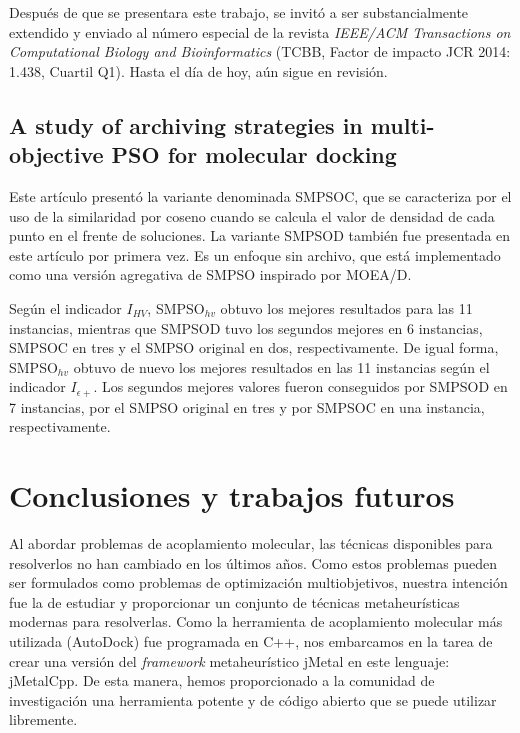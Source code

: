 Después de que se presentara este trabajo, se invitó a ser substancialmente extendido y enviado al número especial de la revista \emph{IEEE/ACM Transactions on Computational Biology and Bioinformatics} (TCBB, Factor de impacto JCR 2014: 1.438, Cuartil Q1). Hasta el día de hoy, aún sigue en revisión.

\subsection*{A study of archiving strategies in multi-objective PSO for molecular docking}


Este artículo presentó la variante denominada SMPSOC, que se caracteriza por el uso de la similaridad por coseno cuando se calcula el valor de densidad de cada punto en el frente de soluciones. La variante SMPSOD también fue presentada en este artículo por primera vez. Es un enfoque sin archivo, que está implementado como una versión agregativa de SMPSO inspirado por MOEA/D.

Según el indicador $I_{HV}$, SMPSO$_{hv}$ obtuvo los mejores resultados para las 11 instancias, mientras que SMPSOD tuvo los segundos mejores en 6 instancias, SMPSOC en tres y el SMPSO original en dos, respectivamente. De igual forma, SMPSO$_{hv}$ obtuvo de nuevo los mejores resultados en las 11 instancias según el indicador $I_{\epsilon+}$. Los segundos mejores valores fueron conseguidos por SMPSOD en 7 instancias, por el SMPSO original en tres y por SMPSOC en una instancia, respectivamente.

\section*{Conclusiones y trabajos futuros}

Al abordar problemas de acoplamiento molecular, las técnicas disponibles para resolverlos no han cambiado en los últimos años. Como estos problemas pueden ser formulados como problemas de optimización multiobjetivos, nuestra intención fue la de estudiar y proporcionar un conjunto de técnicas metaheurísticas modernas para resolverlas. Como la herramienta de acoplamiento molecular más utilizada (AutoDock) fue programada en C++, nos embarcamos en la tarea de crear una versión del \emph{framework} metaheurístico jMetal en este lenguaje: jMetalCpp. De esta manera, hemos proporcionado a la comunidad de investigación una herramienta potente y de código abierto que se puede utilizar libremente.

